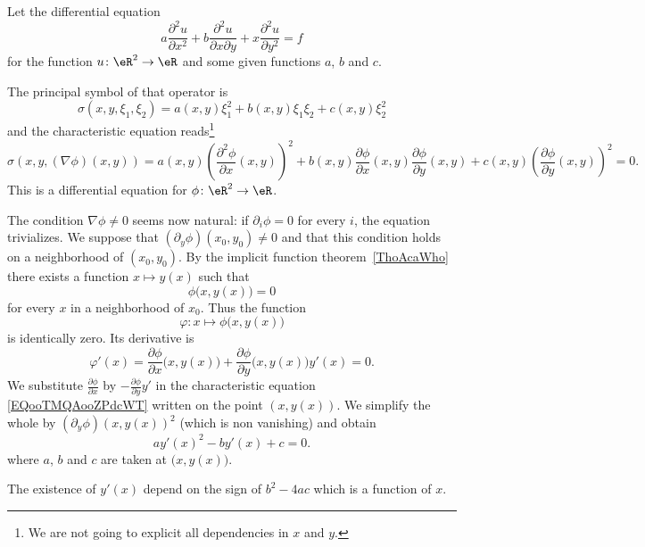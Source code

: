 \begin{example}
	Let the differential equation
	\begin{equation}
		a\frac{ \partial^2u }{ \partial x^2 }+b\frac{ \partial^2u }{ \partial x\partial y }+x\frac{ \partial^2u }{ \partial y^2 }=f
	\end{equation}
	for the function \( u\colon \eR^2\to \eR\) and some given functions \( a\), \( b\) and \( c\).

	The principal symbol of that operator is
	\begin{equation}
		\sigma(x,y,\xi_1,\xi_2)=a(x,y)\xi_1^2+b(x,y)\xi_1\xi_2+c(x,y)\xi_2^2
	\end{equation}
	and the characteristic equation reads\footnote{We are not going to explicit all dependencies in \( x\) and \( y\).}
	\begin{equation}        \label{EQooTMQAooZPdcWT}
		\sigma(x,y,  (\nabla\phi)(x,y)   )=a(x,y)\left( \frac{ \partial^2\phi }{ \partial x }(x,y) \right)^2+b(x,y)\frac{ \partial \phi }{ \partial x }(x,y)\frac{ \partial \phi }{ \partial y }(x,y)+c(x,y)\left( \frac{ \partial \phi }{ \partial y }(x,y) \right)^2=0.
	\end{equation}
	This is a differential equation for \( \phi\colon \eR^2\to \eR\).

	The condition \( \nabla\phi\neq 0\) seems now natural: if \( \partial_i\phi=0\) for every \( i\), the equation trivializes. We suppose that \( (\partial_y\phi)(x_0,y_0)\neq 0\) and that this condition holds on a neighborhood of \( (x_0,y_0)\). By the implicit function theorem~\ref{ThoAcaWho} there exists a function \( x\mapsto y(x)\) such that
	\begin{equation}
		\phi\big( x,y(x) \big)=0
	\end{equation}
	for every \( x\) in a neighborhood of \( x_0\). Thus the function
	\begin{equation}
		\varphi\colon x\mapsto \phi\big( x,y(x) \big)
	\end{equation}
	is identically zero. Its derivative is
	\begin{equation}
		\varphi'(x)=\frac{ \partial \phi }{ \partial x }\big( x,y(x) \big)+\frac{ \partial \phi }{ \partial y }\big( x,y(x) \big)y'(x)=0.
	\end{equation}
	We substitute \( \frac{ \partial \phi }{ \partial x }\) by \( -\frac{ \partial \phi }{ \partial y }y'\) in the characteristic equation \eqref{EQooTMQAooZPdcWT} written on the point \( (x,y(x))\).  We simplify the whole by \( (\partial_y\phi)(x,y(x))^2\) (which is non vanishing) and obtain
	\begin{equation}
		ay'(x)^2-by'(x)+c=0.
	\end{equation}
	where \( a\), \( b\) and \( c\) are taken at \( \big( x,y(x) \big)\).

	The existence of \( y'(x)\) depend on the sign of \( b^2-4ac\) which is a function of \( x\).

\end{example}

